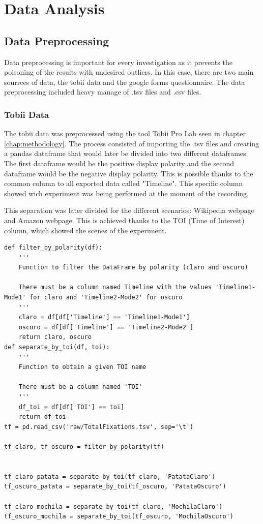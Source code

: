 \chapter{Data Analysis}
\label{chap:data_analysis}

\section{Data Preprocessing}
Data preprocessing is important for every investigation as it prevents the poisoning of the results 
with undesired outliers. In this case, there are two main sourrces of data, the tobii data and the 
google forms questionnaire. The data preprocessing included heavy manage of .tsv files and .csv files.
\subsection{Tobii Data}
The tobii data was preprocessed using the tool Tobii Pro Lab seen in chapter \ref{chap:methodology}.
The process consisted of importing the .tsv files and creating a pandas dataframe that would later be divided
into two different dataframes. The first dataframe would be the positive display polarity and the second 
dataframe would be the negative display polarity. This is possible thanks to the common column to all 
exported data called "Timeline". This specific column showed wich experiment was being performed at the 
moment of the recording. 

This separation was later divided for the different scenarios: Wikipedia webpage and Amazon webpage.
This is achieved thanks to the TOI (Time of Interest) column, which showed the scenes of the experiment.
\begin{lstlisting}[style=pythonstyle] 
def filter_by_polarity(df):
    '''
    Function to filter the DataFrame by polarity (claro and oscuro)

    There must be a column named Timeline with the values 'Timeline1-Mode1' for claro and 'Timeline2-Mode2' for oscuro
    '''
    claro = df[df['Timeline'] == 'Timeline1-Mode1'] 
    oscuro = df[df['Timeline'] == 'Timeline2-Mode2'] 
    return claro, oscuro
def separate_by_toi(df, toi):
    '''
    Function to obtain a given TOI name

    There must be a column named 'TOI' 
    '''
    df_toi = df[df['TOI'] == toi]
    return df_toi
tf = pd.read_csv('raw/TotalFixations.tsv', sep='\t')

tf_claro, tf_oscuro = filter_by_polarity(tf)


tf_claro_patata = separate_by_toi(tf_claro, 'PatataClaro')
tf_oscuro_patata = separate_by_toi(tf_oscuro, 'PatataOscuro')

tf_claro_mochila = separate_by_toi(tf_claro, 'MochilaClaro')
tf_oscuro_mochila = separate_by_toi(tf_oscuro, 'MochilaOscuro')
\end{lstlisting}

